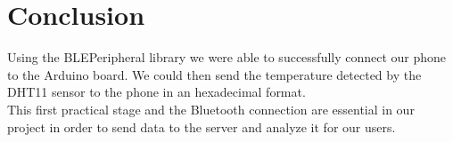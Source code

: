 \section{Conclusion}
Using the BLEPeripheral library we were able to successfully connect our phone to the Arduino board. We could then send the temperature detected by the DHT11 sensor to the phone in an hexadecimal format.\\
This first practical stage and the Bluetooth connection are essential in our project in order to send data to the server and analyze it for our users.


